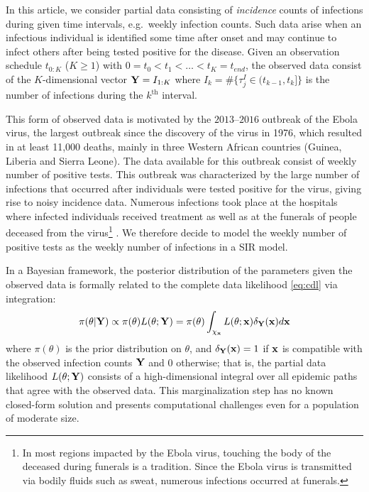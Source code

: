 \documentclass[11pt]{article}
\begin{document}
	In this article, we consider partial data consisting of \textit{incidence} counts of infections during given time intervals, e.g.\ weekly infection counts. Such data arise when an infectious individual is identified some time after onset and may continue to infect others after being tested positive for the disease. Given an observation schedule $t_{0:K}$ ($K \ge 1$) with $0 = t_0 < t_1 < \dots < t_K = t_{end}$, the observed data consist of the $K$-dimensional vector $\mathbf{Y} = I_{1:K}$ where $I_k = \#\{\tau^I_j \in (t_{k-1}, t_k]\}$ is the number of infections during the $k^{\text{th}}$ interval.
	
	This form of observed data is motivated by the $2013$–$2016$ outbreak of the Ebola virus, the largest outbreak since the discovery of the virus in 1976, which resulted in at least 11,000 deaths, mainly in three Western African countries (Guinea, Liberia and Sierra Leone). The data available for this outbreak consist of weekly number of positive tests. This outbreak was characterized by the large number of infections that occurred after individuals were tested positive for the virus, giving rise to noisy incidence data. Numerous infections took place at the hospitals where infected individuals received treatment as well as at the funerals of people deceased from the virus\footnote{In most regions impacted by the Ebola virus, touching the body of the deceased during funerals is a tradition. Since the Ebola virus is transmitted via bodily fluids such as sweat, numerous infections occurred at funerals.} \cite{Coltart.2017}. We therefore decide to model the weekly number of positive tests as the weekly number of infections in a SIR model.
	
	
	In a Bayesian framework, the posterior distribution of the parameters given the observed data is formally related to the complete data likelihood \eqref{eq:cdl} via integration:
	\begin{equation}
		\label{eq:pdl}
		\pi(\theta|\mathbf{Y}) 
		\propto \pi(\theta) L(\theta; \mathbf{Y}) = \pi(\theta) \int_{\chi_{\mathbf{x}}} L(\theta; \mathbf{x}) \delta_{\mathbf{Y}}(\mathbf{x}) d\mathbf{x}
	\end{equation}
	where $\pi(\theta)$ is the prior distribution on $\theta$, and
	$\delta_{\mathbf{Y}}(\mathbf{x}) = 1$ if $\mathbf{x}$ is compatible with the observed infection counts $\mathbf{Y}$ and $0$ otherwise; that is, the partial data likelihood $L(\theta; \mathbf{Y})$ consists of a high-dimensional integral over all epidemic paths that agree with the observed data. This marginalization step has no known closed-form solution and presents computational challenges even for a population of moderate size.
	
\end{document}
